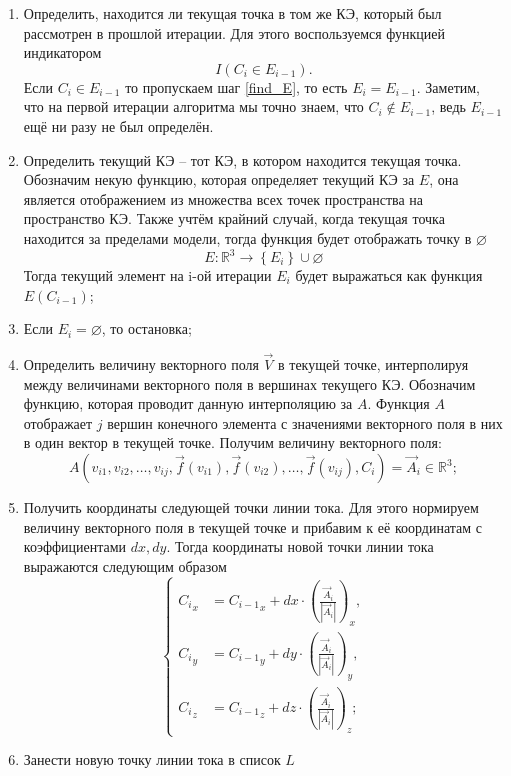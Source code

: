 \begin{enumerate}
	\item Определить, находится ли текущая точка в том же КЭ, который был рассмотрен в прошлой итерации. Для этого воспользуемся функцией индикатором
	\begin{equation*}
		I(C_i\in E_{i-1}).
	\end{equation*}
	Если $C_i\in E_{i-1}$ то пропускаем шаг \ref{find_E}, то есть $E_i=E_{i-1}$.
	Заметим, что на первой итерации алгоритма мы точно знаем, что $C_i\notin E_{i-1}$, ведь $E_{i-1}$ ещё ни разу не был определён.
	\item\label{find_E} Определить текущий КЭ -- тот КЭ, в котором находится текущая точка. Обозначим некую функцию, которая определяет текущий КЭ за $E$, она является отображением из множества всех точек пространства на пространство КЭ. Также учтём крайний случай, когда текущая точка находится за пределами модели, тогда функция будет отображать точку в $\varnothing$
	\begin{equation*}
		E: \mathbb{R}^3 \to \left\{E_i\right\} \cup \varnothing
	\end{equation*}
	Тогда текущий элемент на i-ой итерации $E_i$ будет выражаться как функция $E(C_{i-1})$;
	\item Если $E_i=\varnothing$, то остановка;
	\item Определить величину векторного поля $\vec V$ в текущей точке, интерполируя между величинами векторного поля в вершинах текущего КЭ. Обозначим функцию, которая проводит данную интерполяцию за $A$. Функция $A$ отображает $j$ вершин конечного элемента с значениями векторного поля в них в один вектор в текущей точке. Получим величину векторного поля:
	\begin{equation*}
		A(v_{i1},v_{i2},\dots,v_{ij}, \vec{f}(v_{i1}),\vec{f}(v_{i2}),\dots,\vec{f}(v_{ij}), C_i) = \vec{A}_{i}\in\mathbb{R}^3;
	\end{equation*}
	\item Получить координаты следующей точки линии тока. Для этого нормируем величину векторного поля в текущей точке и прибавим к её координатам с коэффициентами $dx, dy$. Тогда координаты новой точки линии тока выражаются следующим образом
	\begin{equation*}
		\begin{cases}
		{C_i}_x &= {C_{i-1}}_x + dx\cdot\left(\frac{\vec{A}_i}{|\vec{A}_i|}\right)_x,\\
		{C_i}_y &= {C_{i-1}}_y + dy\cdot\left(\frac{\vec{A}_i}{|\vec{A}_i|}\right)_y,\\
		{C_i}_z &= {C_{i-1}}_z + dz\cdot\left(\frac{\vec{A}_i}{|\vec{A}_i|}\right)_z;
		\end{cases}
	\end{equation*}
	\item Занести новую точку линии тока в список $L$
\end{enumerate}

